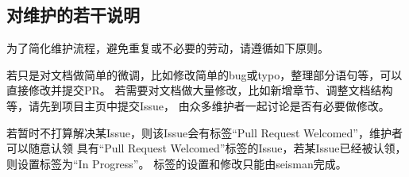 \subsection{对维护的若干说明}
为了简化维护流程，避免重复或不必要的劳动，请遵循如下原则。

若只是对文档做简单的微调，比如修改简单的bug或typo，整理部分语句等，可以直接修改并提交PR。
若需要对文档做大量修改，比如新增章节、调整文档结构等，请先到项目主页中提交Issue，
由众多维护者一起讨论是否有必要做修改。

若暂时不打算解决某Issue，则该Issue会有标签``Pull Request Welcomed''，维护者可以随意认领
具有``Pull Request Welcomed''标签的Issue，若某Issue已经被认领，则设置标签为``In Progress''。
标签的设置和修改只能由seisman完成。
